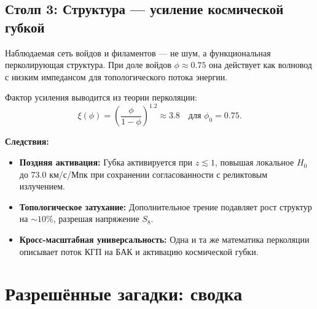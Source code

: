 \documentclass[12pt,a4paper]{article}
\begin{document}
\subsection{Столп 3: Структура — усиление космической губкой}

Наблюдаемая сеть войдов и филаментов — не шум, а функциональная перколирующая структура. При доле войдов $\phi \approx 0.75$ она действует как волновод с низким импедансом для топологического потока энергии.

Фактор усиления выводится из теории перколяции:
\begin{equation}
\xi(\phi) = \left(\frac{\phi}{1-\phi}\right)^{1.2} \approx 3.8 \quad \text{для } \phi_0 = 0.75.
\end{equation}

\textbf{Следствия:}
\begin{itemize}
    \item \textbf{Поздняя активация:} Губка активируется при $z \lesssim 1$, повышая локальное $H_0$ до $73.0$ км/с/Мпк при сохранении согласованности с реликтовым излучением.
    \item \textbf{Топологическое затухание:} Дополнительное трение подавляет рост структур на $\sim 10\%$, разрешая напряжение $S_8$.
    \item \textbf{Кросс-масштабная универсальность:} Одна и та же математика перколяции описывает поток КГП на БАК и активацию космической губки.
\end{itemize}

\section{Разрешённые загадки: сводка}
\end{document}
